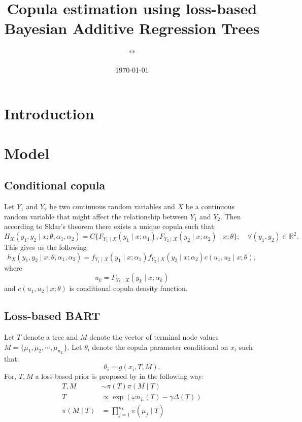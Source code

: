 \documentclass{amsart}
\title{Copula estimation using loss-based Bayesian Additive Regression Trees}
\author{**}
\date{\today}
\begin{document}
\maketitle

\section{Introduction}

\section{Model}

\subsection{Conditional copula}

Let $Y_1$ and $Y_2$ be two continuous random variables and $X$ be a continuous random variable 
that might affect the relationship between $Y_1$ and $Y_2$. 
Then according to Sklar’s theorem there exists a unique copula such that:
\begin{equation}
    H_{X}(y_1,y_2\mid x; \theta, \alpha_1, \alpha_2) = C\{F_{Y_1\mid X}(y_1\mid x;\alpha_1),F_{Y_2\mid X}(y_2\mid x; \alpha_2)\mid x;\theta\}; \quad \forall (y_1,y_2) \in \mathbb{R}^2.
\end{equation}
This gives us the following
\begin{equation}
    h_{X}(y_1,y_2\mid x; \theta, \alpha_1, \alpha_2) = f_{Y_1\mid X}(y_1\mid x;\alpha_1)f_{Y_2\mid X}(y_2\mid x; \alpha_2)c(u_1,u_2\mid x;\theta),
\end{equation}
where
\begin{equation}\label{eq:emp_dist:Y}
    u_k = F_{Y_k\mid X}(y_k\mid x; \alpha_k)
\end{equation}
and $c(u_1,u_2\mid x;\theta)$ is conditional copula density function.

\subsection{Loss-based BART}

Let $T$ denote a tree and $M$ denote the vector of terminal node values $M = \{\mu_1,\mu_2, \cdots, \mu_{n_L}\}$. Let $\theta_i$ denote the copula parameter conditional on $x_i$ such that:
\begin{equation}
	\theta_i = g(x_i, T, M).
\end{equation}
For, $T,M$ a loss-based prior is proposed by \citet{serafini2024lossbasedpriortreetopologies} in the following way:
\begin{align}
	T, M &\sim \pi(T)\pi(M\mid T)\\
	T &\propto \exp\left(\omega n_L(T)-\gamma\Delta(T)\right)\\
	\pi(M\mid T) & = \prod_{j=1}^{n_L}\pi(\mu_j\mid T)
\end{align}
\end{document}
